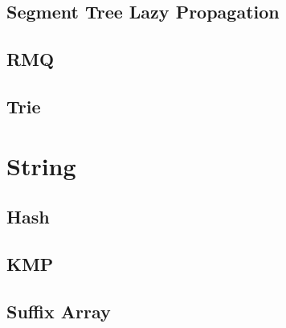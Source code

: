 \documentclass[a4paper,landscape]{article}
\begin{document}
\begin{multicols}{2}
\subsection{Segment Tree Lazy Propagation}
	
\subsection{RMQ}
	
\subsection{Trie}
	


\section{String}
\subsection{Hash}
	
\subsection{KMP}
	
\subsection{Suffix Array}
	

\end{multicols}
\end{document}
